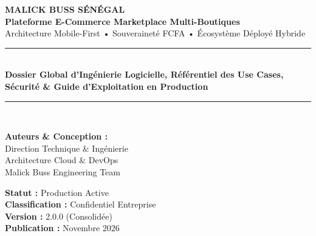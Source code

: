 \documentclass[11pt,a4paper,titlepage]{report}
\begin{document}
\begin{titlepage}
    \centering
    \vspace*{1cm}
    
    {\Huge \bfseries \textcolor{primary}{MALICK BUSS SÉNÉGAL}}\\[0.3cm]
    {\LARGE \textcolor{accent}{\textbf{Plateforme E-Commerce Marketplace Multi-Boutiques}}}\\[0.2cm]
    {\large Architecture Mobile-First • Souveraineté FCFA • Écosystème Déployé Hybride}\\[1cm]
    
    \rule{\linewidth}{1.5pt}\\[0.4cm]
    {\huge \bfseries Dossier Global d'Ingénierie Logicielle, Référentiel des Use Cases, Sécurité \& Guide d'Exploitation en Production}\\[0.2cm]
    \rule{\linewidth}{1.5pt}\\[1.5cm]
    
    \begin{minipage}{0.48\textwidth}
        \begin{flushleft} \large
            \textbf{Auteurs \& Conception :} \\
            Direction Technique \& Ingénierie\\
            Architecture Cloud \& DevOps\\
            Malick Buss Engineering Team
        \end{flushleft}
    \end{minipage}
    \begin{minipage}{0.48\textwidth}
        \begin{flushright} \large
            \textbf{Statut :} Production Active\\
            \textbf{Classification :} Confidentiel Entreprise\\
            \textbf{Version :} 2.0.0 (Consolidée)\\
            \textbf{Publication :} Novembre 2026
        \end{flushright}
    \end{minipage}
    
    \vfill
    

\end{titlepage}
\end{document}

